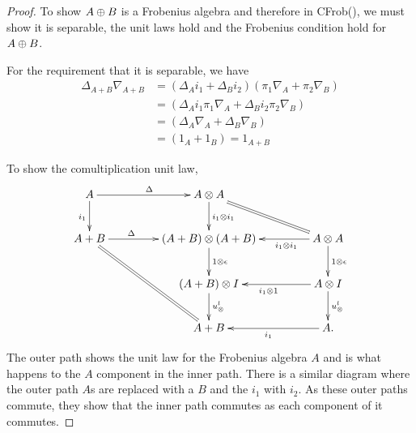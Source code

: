 \begin{proof}

  To show $A\oplus B$ is a Frobenius algebra and therefore in CFrob(\X), we must show it is separable,
  the unit laws hold and the Frobenius condition hold for $A\oplus B$.

  For the requirement that it is separable, we have
  \begin{align*}
    \Delta_{A+B}\nabla_{A+B}&= (\Delta_A i_1 + \Delta_B i_2) (\pi_1 \nabla_A + \pi_2 \nabla_B)\\
    &=  (\Delta_A i_1 \pi_1 \nabla_A + \Delta_B i_2\pi_2 \nabla_B)\\
    &=  (\Delta_A \nabla_A + \Delta_B \nabla_B)\\
    &=  (1_A + 1_B) = 1_{A+B}
  \end{align*}


  To show the comultiplication unit law,
  \[
     \xymatrix@C+20pt{
       A \ar[r]^{\Delta} \ar[d]_{i_1} & A\*A \ar[d]^{i_1\*i_1} \ar@{=}[dr] \\
       A+B \ar[r]^(.35){\Delta} \ar@{=}[ddr] &(A+B)\*(A+B) \ar[d]^{1\*\epsilon}
          & A\*A \ar[l]^(.35){i_1\*i_1}  \ar[d]^{1\*\epsilon}\\
       & (A+B)\*I \ar[d]^{\usl} & A\*I \ar[d]^{\usl} \ar[l]^{i_1\*1}\\
       & A+B & A. \ar[l]^{i_1}
     }
  \]
  The outer path shows the unit law for the Frobenius algebra $A$ and is what happens to the $A$
  component in the inner path. There is a similar diagram where the outer path $A$s are replaced
  with a $B$ and the $i_1$ with $i_2$. As these outer paths commute, they show that the inner path
  commutes as each component of it commutes.


\end{proof}
